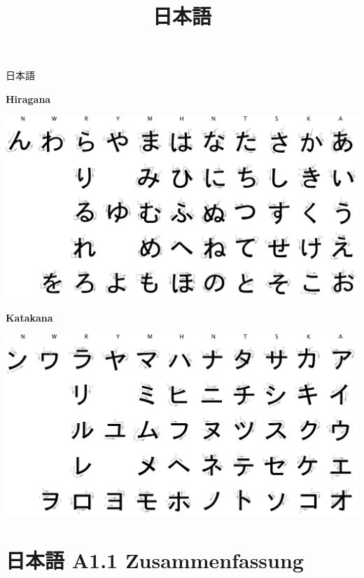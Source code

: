 \documentclass[12pt,ngerman]{article}
\title{日本語}
\author{}
\date{}
\begin{document}

\begin{center}
    \Huge 日本語
\end{center}

\vfill

\begin{center}
    \textbf{Hiragana}
\end{center}

\includegraphics[width=\textwidth]{hiragana.pdf}

\bigskip
\bigskip

\begin{center}
    \textbf{Katakana}
\end{center}

\includegraphics[width=\textwidth]{katakana.pdf}

\vfill

\newpage


\section*{日本語 A1.1 Zusammenfassung}
\end{document}
